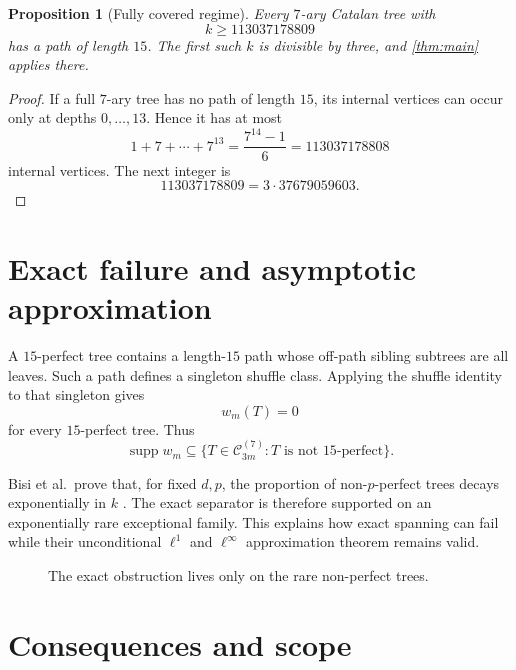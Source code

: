 \documentclass[11pt,reqno]{amsart}
\newtheorem{proposition}[theorem]{Proposition}
\newcommand{\cC}{\mathcal C}
\newcommand{\supp}{\operatorname{supp}}
\begin{document}
\begin{proposition}[Fully covered regime]\label{prop:covered}
Every $7$-ary Catalan tree with
\[
 k\geq113037178809
\]
has a path of length $15$.  The first such $k$ is divisible by three, and
\cref{thm:main} applies there.
\end{proposition}

\begin{proof}
If a full $7$-ary tree has no path of length $15$, its internal vertices can
occur only at depths $0,\ldots,13$.  Hence it has at most
\[
 1+7+\cdots+7^{13}=\frac{7^{14}-1}{6}=113037178808
\]
internal vertices.  The next integer is
\[
 113037178809=3\cdot37679059603.
\]
\end{proof}

\section{Exact failure and asymptotic approximation}

A $15$-perfect tree contains a length-$15$ path whose off-path sibling
subtrees are all leaves.  Such a path defines a singleton shuffle class.
Applying the shuffle identity to that singleton gives
\[
 w_m(T)=0
\]
for every $15$-perfect tree.  Thus
\[
 \supp w_m\subseteq
 \{T\in\cC_{3m}^{(7)}:T\text{ is not $15$-perfect}\}.
\]

Bisi et al.\ prove that, for fixed $d,p$, the proportion of non-$p$-perfect
trees decays exponentially in $k$ \cite[Theorem~1.7]{BisiEtAl}.  The exact
separator is therefore supported on an exponentially rare exceptional
family.  This explains how exact spanning can fail while their unconditional
$\ell^1$ and $\ell^\infty$ approximation theorem remains valid.

\begin{figure}[ht]
\centering
{}
\caption{The exact obstruction lives only on the rare non-perfect trees.}
\label{fig:rarity}
\end{figure}

\section{Consequences and scope}
\end{document}
